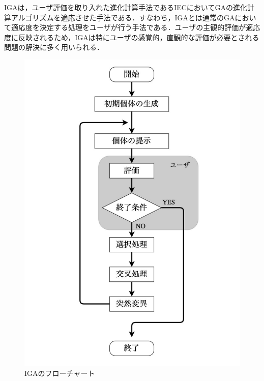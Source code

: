 IGAは，ユーザ評価を取り入れた進化計算手法であるIECにおいてGAの進化計算アルゴリズムを適応させた手法である．すなわち，IGAとは通常のGAにおいて適応度を決定する処理をユーザが行う手法である．ユーザの主観的評価が適応度に反映されるため，IGAは特にユーザの感覚的，直観的な評価が必要とされる問題の解決に多く用いられる．
\begin{figure}[p]
\begin{center}

\vspace{1.5cm}
\includegraphics[scale=0.45]{figurefolder/chapter2/IGaFlowchart.pdf}
\caption{IGAのフローチャート}
\label{対話型遺伝的アルゴリズムのフローチャート}

\end{center}
\end{figure}



\newpage

